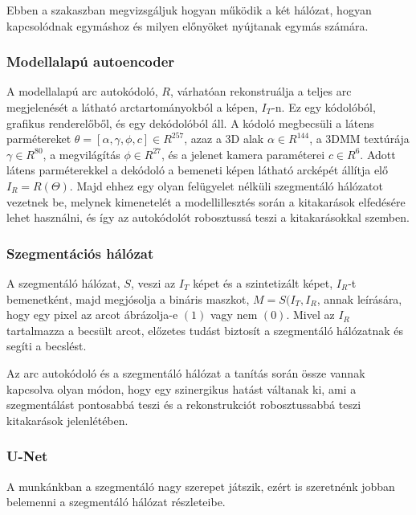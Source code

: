 \documentclass[12pt,a4]{article}
\begin{document}
            Ebben a szakaszban megvizsgáljuk hogyan működik a két hálózat,
     	      hogyan kapcsolódnak egymáshoz és milyen előnyöket nyújtanak
     	      egymás számára.

            \subsubsection{Modellalapú autoencoder}
        
                \cite{focus}A modellalapú arc autokódoló, $R$, várhatóan rekonstruálja a teljes arc
     	          megjelenését a látható arctartományokból a képen, $I_{T}$-n. 
                Ez egy kódolóból, grafikus renderelőből, és egy dekódolóból áll. A kódoló megbecsüli a látens parmétereket $\theta = [\alpha, \gamma, \phi, c] \in R^{257}$, azaz a 3D alak $\alpha \in R^{144}$, a 3DMM textúrája 
                $\gamma ∈ R^{80}$, a megvilágítás $\phi ∈ R^{27}$, és a jelenet kamera paraméterei $c ∈ R^{6}$. Adott látens parméterekkel a dekódoló a bemeneti képen látható arcképét állítja elő $I_{R} = R(\Theta)$. Majd ehhez egy olyan felügyelet nélküli szegmentáló hálózatot vezetnek be, melynek kimenetelét a modellillesztés során a kitakarások elfedésére lehet használni, és így az autokódolót robosztussá teszi a kitakarásokkal szemben.

            \subsubsection{Szegmentációs hálózat}
    
                \cite{focus}A szegmentáló hálózat, $S$, veszi az $I_{T}$ képet és a szintetizált képet, $I_{R}$-t bemenetként, majd megjósolja a bináris maszkot, $M = S(I_{T} , I_{R}$, annak leírására, hogy egy pixel az arcot ábrázolja-e $(1)$ vagy nem $(0)$. Mivel az $I_R$ tartalmazza a becsült arcot, előzetes tudást biztosít a szegmentáló hálózatnak és segíti a becslést.
     	
     	          Az arc autokódoló és a szegmentáló hálózat a tanítás során össze 
                vannak kapcsolva olyan módon, hogy egy szinergikus hatást váltanak ki, ami a szegmentálást pontosabbá teszi és a rekonstrukciót robosztussabbá teszi kitakarások jelenlétében.

            \subsubsection{U-Net}
    
                A munkánkban a szegmentáló nagy szerepet játszik, ezért is szeretnénk jobban belemenni a szegmentáló hálózat részleteibe.
    
\end{document}
